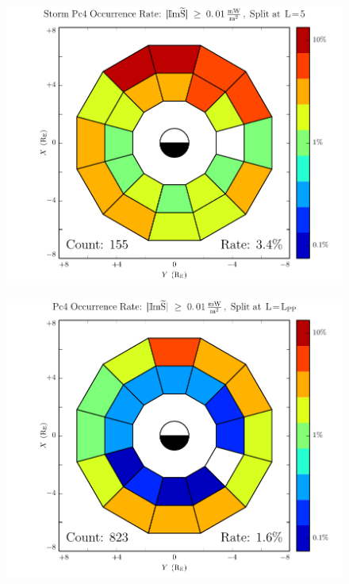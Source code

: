 \begin{figure}[!htb]
    \centering
    \includegraphics[width=\textwidth]{figures/rate_storm.pdf}
    \caption[Pc4 Rate: Dst$< \SI{-30}{\nT}$]{
    }
    \label{fig_rate_storm}
\end{figure}

\begin{figure}[!htb]
    \centering
    \includegraphics[width=\textwidth]{figures/rate_all_lpp.pdf}
    \caption[Pc4 Rate Inside and Outside the Plasmapause]{
    }
    \label{fig_rate_all_lpp}
\end{figure}

